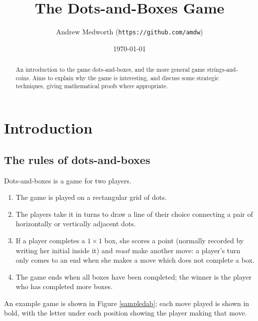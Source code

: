 \documentclass[a4paper,twocolumn]{article}
\begin{document}
\title{The Dots-and-Boxes Game}
\author{Andrew Medworth (\texttt{https://github.com/amdw})}
\date{\today}
\maketitle

\begin{abstract}
  An introduction to the game dots-and-boxes, and the more general game
  strings-and-coins. Aims to explain why the game is interesting, and discuss
  some strategic techniques, giving mathematical proofs where appropriate.
\end{abstract}

\tableofcontents

\section{Introduction}

\subsection{The rules of dots-and-boxes}

Dots-and-boxes is a game for two players.

\begin{enumerate}
  \item The game is played on a rectangular grid of dots.
  \item The players take it in turns to draw a line of their choice
    connecting a pair of horizontally or vertically adjacent dots.
  \item If a player completes a $1 \times 1$ box, she scores a point
    (normally recorded by writing her initial inside it) and
    \emph{must} make another move: a player's turn only comes to an
    end when she makes a move which does not complete a box.
  \item The game ends when all boxes have been completed; the winner
    is the player who has completed more boxes.
\end{enumerate}

An example game is shown in Figure \ref{sampledab}; each move played
is shown in bold, with the letter under each position showing the
player making that move.

\begin{figure*}
  \centering
  \def\svgscale{0.7}
  
  \caption{Sample dots-and-boxes game, which player $A$ wins 3--1}
  \label{sampledab}
\end{figure*}
\end{document}

